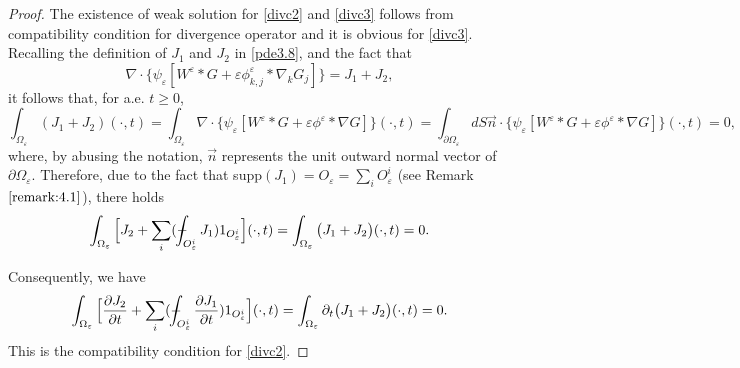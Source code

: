 \documentclass[13pt,CJK]{article}
\theoremstyle{plain}                       %
\theoremstyle{remark}
\numberwithin{equation}{section}
\def\Xint#1{\mathchoice
  {\XXint\displaystyle\textstyle{#1}}%
  {\XXint\textstyle\scriptstyle{#1}}%
  {\XXint\scriptstyle\scriptscriptstyle{#1}}%
  {\XXint\scriptscriptstyle\scriptscriptstyle{#1}}%
  \!\int}
\def\XXint#1#2#3{{\setbox0=\hbox{$#1{#2#3}{\int}$}
  \vcenter{\hbox{$#2#3$}}\kern-.5\wd0}}
\def\dashint{\Xint-}
\begin{document}
\begin{proof}
The existence of weak solution for \eqref{divc2} and \eqref{divc3} follows from compatibility condition for divergence operator and
it is obvious for \eqref{divc3}.
Recalling the definition of $J_1$ and $J_2$ in \eqref{pde3.8}, and the fact
that
\begin{equation*}
\nabla\cdot\bigg\{
\psi_{\varepsilon}[W^{\varepsilon}\ast G+\varepsilon\phi^{\varepsilon}_{k,j}\ast \nabla_k G_j]
\bigg\}=J_1+J_2,
\end{equation*}
it follows that, for a.e. $t\geq0$,
\begin{equation*}
\int_{\Omega_{\varepsilon}}(J_1+J_2)(\cdot,t)
=\int_{\Omega_{\varepsilon}}
\nabla\cdot\bigg\{
\psi_{\varepsilon}[W^{\varepsilon}\ast G+\varepsilon\phi^{\varepsilon}\ast \nabla G]
\bigg\}(\cdot,t)=\int_{\partial \Omega_{\varepsilon}}dS\vec{n}\cdot\bigg\{
\psi_{\varepsilon}[W^{\varepsilon}\ast G+\varepsilon\phi^{\varepsilon}\ast \nabla G]
\bigg\}(\cdot,t)=0,
\end{equation*}
where, by abusing the notation, $\vec{n}$ represents the unit outward normal vector of
$\partial\Omega_\varepsilon$.
Therefore, due to the fact that supp$(J_1)=O_{\varepsilon}=
\sum\limits_{i}O_{\varepsilon}^i$ (see Remark $\ref{remark:4.1}$),
there holds
\begin{equation*}
\begin{aligned}
\int_{\Omega_{\varepsilon}}
\Big[ J_2+\sum_{i} (\dashint_{O_{\varepsilon}^i} J_1)1_{O_{\varepsilon}^i} \Big](\cdot,t)=\int_{\Omega_{\varepsilon}}
\big(J_1+J_2\big)(\cdot,t)=0.
\end{aligned}
\end{equation*}

Consequently, we have
\begin{equation*}
\int_{\Omega_{\varepsilon}}
\Big[\frac{\partial J_2}{\partial t} +\sum_{i} (\dashint_{O_{\varepsilon}^i}\frac{\partial J_1}{\partial t})1_{O_{\varepsilon}^i}\Big](\cdot,t)=
\int_{\Omega_{\varepsilon}}
 \partial_t \big(J_1+J_2\big)(\cdot,t)=0.
\end{equation*}
This is the compatibility condition for \eqref{divc2}.
\end{proof}


\medskip
\end{document}

